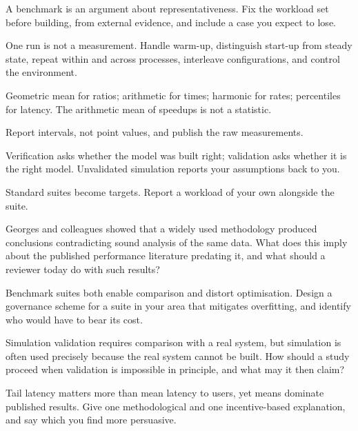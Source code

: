 \begin{chaptersummary}
\begin{tight}
  \item A benchmark is an argument about representativeness. Fix the workload
    set before building, from external evidence, and include a case you expect
    to lose.
  \item One run is not a measurement. Handle warm-up, distinguish start-up from
    steady state, repeat within and across processes, interleave
    configurations, and control the environment.
  \item Geometric mean for ratios; arithmetic for times; harmonic for rates;
    percentiles for latency. The arithmetic mean of speedups is not a
    statistic.
  \item Report intervals, not point values, and publish the raw measurements.
  \item Verification asks whether the model was built right; validation asks
    whether it is the right model. Unvalidated simulation reports your
    assumptions back to you.
  \item Standard suites become targets. Report a workload of your own alongside
    the suite.
\end{tight}
\end{chaptersummary}

\begin{reviewq}
  \item Georges and colleagues showed that a widely used methodology produced
    conclusions contradicting sound analysis of the same data. What does this
    imply about the published performance literature predating it, and what
    should a reviewer today do with such results?
  \item Benchmark suites both enable comparison and distort optimisation.
    Design a governance scheme for a suite in your area that mitigates
    overfitting, and identify who would have to bear its cost.
  \item Simulation validation requires comparison with a real system, but
    simulation is often used precisely because the real system cannot be built.
    How should a study proceed when validation is impossible in principle, and
    what may it then claim?
  \item Tail latency matters more than mean latency to users, yet means
    dominate published results. Give one methodological and one incentive-based
    explanation, and say which you find more persuasive.
\end{reviewq}

